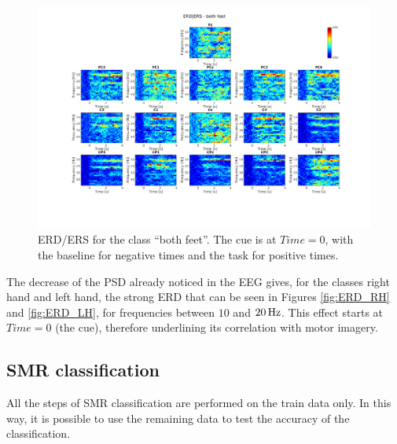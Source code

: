 \begin{figure}
   \centering
   \includegraphics[width=\textwidth]{images/ERD_BF.png}
   \caption{ERD/ERS for the class ``both feet''. The cue is at $Time = 0$, with the baseline for negative times and the task for positive times.}
   \label{fig:ERD_BF}
\end{figure}
The decrease of the PSD already noticed in the EEG gives, for the classes right hand and left hand, the strong ERD that can be seen in Figures \ref{fig:ERD_RH} and \ref{fig:ERD_LH}, for frequencies between $10$ and $\unit[20]{Hz}$.
This effect starts at $Time = 0$ (the cue), therefore underlining its correlation with motor imagery.

\subsection{SMR classification}
All the steps of SMR classification are performed on the train data only.
In this way, it is possible to use the remaining data to test the accuracy of the classification.
